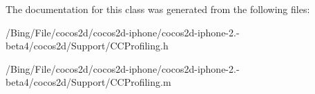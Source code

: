 The documentation for this class was generated from the following files\-:\begin{DoxyCompactItemize}
\item 
/\-Bing/\-File/cocos2d/cocos2d-\/iphone/cocos2d-\/iphone-\/2.-\/beta4/cocos2d/\-Support/C\-C\-Profiling.\-h\item 
/\-Bing/\-File/cocos2d/cocos2d-\/iphone/cocos2d-\/iphone-\/2.-\/beta4/cocos2d/\-Support/C\-C\-Profiling.\-m\end{DoxyCompactItemize}
